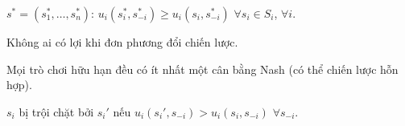 \documentclass[12pt,a4paper]{article}
\begin{document}
\begin{dinhnghia}[title={Cân bằng Nash}]
  $s^* = (s_1^*, \ldots, s_n^*)$: $u_i(s_i^*, s_{-i}^*) \ge u_i(s_i, s_{-i}^*)$ $\forall s_i \in S_i$, $\forall i$.

  Không ai có lợi khi đơn phương đổi chiến lược.
\end{dinhnghia}

\begin{dinhly}[title={Nash (1950)}]
  Mọi trò chơi hữu hạn đều có ít nhất một cân bằng Nash (có thể chiến lược hỗn hợp).
\end{dinhly}

\begin{dinhnghia}[title={Chiến lược trội}]
  $s_i$ bị trội chặt bởi $s_i'$ nếu $u_i(s_i', s_{-i}) > u_i(s_i, s_{-i})$ $\forall s_{-i}$.
\end{dinhnghia}
\end{document}
